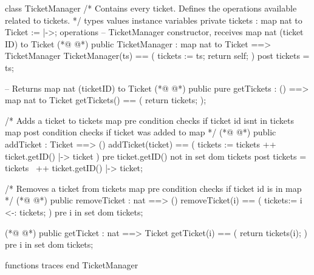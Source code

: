 \begin{vdmpp}[breaklines=true]
class TicketManager
/*
  Contains every ticket.
  Defines the operations available related to tickets.
*/
types
values
instance variables
 private tickets : map nat to Ticket := {|->};
operations
 -- TicketManager constructor, receives map nat (ticket ID) to Ticket
(*@
\label{TicketManager:12}
@*)
 public TicketManager : map nat to Ticket ==> TicketManager
  TicketManager(ts) == (
   tickets := ts;
   return self;
  )
 post tickets = ts;
  
 -- Returns map nat (ticketID) to Ticket
(*@
\label{getTickets:20}
@*)
 public pure getTickets : () ==> map nat to Ticket
 getTickets() == (
  return tickets;
 );
 
 /*
  Adds a ticket to tickets map
  pre condition checks if ticket id isnt in tickets map
  post condition checks if ticket was added to map
 */ 
(*@
\label{addTicket:30}
@*)
 public addTicket : Ticket ==> ()
 addTicket(ticket) == (
  tickets := tickets ++ {ticket.getID() |-> ticket}
 )
 pre ticket.getID() not in set dom tickets
 post tickets = tickets~ ++ {ticket.getID() |-> ticket};
 
 /*
  Removes a ticket from tickets map
  pre condition checks if ticket id is in map
 */
(*@
\label{removeTicket:41}
@*)
 public removeTicket : nat ==> ()
 removeTicket(i) == (
  tickets:= {i} <-: tickets; 
 )
 pre i in set dom tickets;
 
 
(*@
\label{getTicket:48}
@*)
 public getTicket : nat ==> Ticket
 getTicket(i) == (
  return tickets(i);
 )
 pre i in set dom tickets;
 
functions
traces
end TicketManager
\end{vdmpp}
